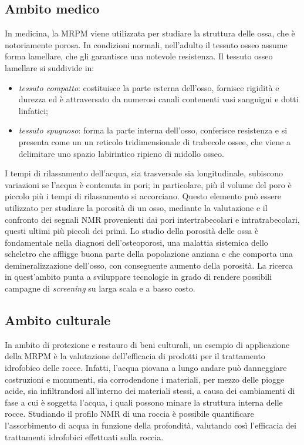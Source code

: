 \documentclass{report}
\numberwithin{equation}{section}
\numberwithin{figure}{section}
\begin{document}
\subsection{Ambito medico}
In medicina, la MRPM viene utilizzata per studiare la struttura delle ossa, che è notoriamente porosa. In condizioni normali, nell'adulto il tessuto osseo assume forma lamellare, che gli garantisce una notevole resistenza. Il tessuto osseo lamellare si suddivide in:
\begin{itemize}[label=$-$]
    \item \emph{tessuto compatto}: costituisce la parte esterna dell'osso, fornisce rigidità e durezza ed è attraversato da numerosi canali contenenti vasi sanguigni e dotti linfatici;
    \item \emph{tessuto spugnoso}: forma la parte interna dell'osso, conferisce resistenza e si presenta come un un reticolo tridimensionale di trabecole ossee, che viene a delimitare uno spazio labirintico ripieno di midollo osseo.
\end{itemize}
I tempi di rilassamento dell'acqua, sia trasversale sia longitudinale, subiscono variazioni se l'acqua è contenuta in pori; in particolare, più il volume del poro è piccolo più i tempi di rilassamento si accorciano. Questo elemento può essere utilizzato per studiare la porosità di un osso, mediante la valutazione e il confronto dei segnali NMR provenienti dai pori intertrabecolari e intratrabecolari, questi ultimi più piccoli dei primi. Lo studio della porosità delle ossa è fondamentale nella diagnosi dell'osteoporosi, una malattia sistemica dello scheletro che affligge buona parte della popolazione anziana e che comporta una demineralizzazione dell'osso, con conseguente aumento della porosità. La ricerca in quest'ambito punta a sviluppare tecnologie in grado di rendere possibili campagne di \textit{screening} su larga scala e a basso costo.

\subsection{Ambito culturale}
In ambito di protezione e restauro di beni culturali, un esempio di applicazione della MRPM è la valutazione dell'efficacia di prodotti per il trattamento idrofobico delle rocce. Infatti, l'acqua piovana a lungo andare può danneggiare costruzioni e monumenti, sia corrodendone i materiali, per mezzo delle piogge acide, sia infiltrandosi all'interno dei materiali stessi, a causa dei cambiamenti di fase a cui è soggetta l'acqua, i quali possono minare la struttura interna delle rocce. Studiando il profilo NMR di una roccia è possibile quantificare l'assorbimento di acqua in funzione della profondità, valutando così l'efficacia dei trattamenti idrofobici effettuati sulla roccia.
\end{document}
